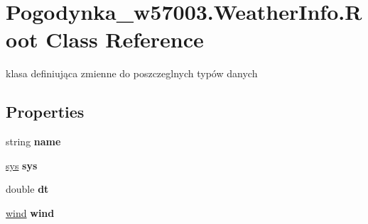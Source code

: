\hypertarget{class_pogodynka__w57003_1_1_weather_info_1_1_root}{}\section{Pogodynka\+\_\+w57003.\+Weather\+Info.\+Root Class Reference}
\label{class_pogodynka__w57003_1_1_weather_info_1_1_root}


klasa definiująca zmienne do poszczeglnych typów danych  


\subsection*{Properties}
\begin{DoxyCompactItemize}
\item 
\mbox{\label{class_pogodynka__w57003_1_1_weather_info_1_1_root_a4e784c691547e5eb47a40d8cc17b5805}} 
string {\bfseries name}
\item 
\mbox{\label{class_pogodynka__w57003_1_1_weather_info_1_1_root_a8404fcd32d7428b2782681cf25c9188c}} 
\mbox{\hyperlink{class_pogodynka__w57003_1_1_weather_info_1_1sys}{sys}} {\bfseries sys}
\item 
\mbox{\label{class_pogodynka__w57003_1_1_weather_info_1_1_root_a41b80a99d4e4864b40a5d745f6a93b34}} 
double {\bfseries dt}
\item 
\mbox{\label{class_pogodynka__w57003_1_1_weather_info_1_1_root_a3dd37af5f4d666b11cf02f80616ceb58}} 
\mbox{\hyperlink{class_pogodynka__w57003_1_1_weather_info_1_1wind}{wind}} {\bfseries wind}
\item 
\mbox{\label{class_pogodynka__w57003_1_1_weather_info_1_1_root_adea9bc13eac4c39acf91d8e9a880daf6}} 

\end{DoxyCompactItemize}
